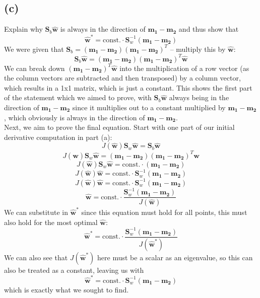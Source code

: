 \documentclass{article}
\begin{document}
{\subsection*{(c)}
Explain why \(\mathbf{S}_b \hat{\mathbf{w}}\) is always in the direction of \(\mathbf{m_1} - \mathbf{m_2}\) and thus show that 
\[
  \hat{\mathbf{w}}^* = \text{const.} \cdot \mathbf{S}_w^{-1} (\mathbf{m_1} - \mathbf{m_2})
\]
We were given that \(\mathbf{S}_b = (\mathbf{m_1} - \mathbf{m_2}) (\mathbf{m_1} - \mathbf{m_2})^T\) -- multiply this by \(\hat{\mathbf{w}}\):
\[
  \mathbf{S}_b \hat{\mathbf{w}} = (\mathbf{m_1} - \mathbf{m_2}) (\mathbf{m_1} - \mathbf{m_2})^T \hat{\mathbf{w}}
\]
We can break down \((\mathbf{m_1} - \mathbf{m_2})^T \hat{\mathbf{w}}\) into the multiplication of a row vector (as the column vectors are subtracted and then transposed) by a column vector, which results in a 1x1 matrix, which is just a constant. This shows the first part of the statement which we aimed to prove, with \(\mathbf{S}_b \hat{\mathbf{w}}\) always being in the direction of \(\mathbf{m_1} - \mathbf{m_2}\) since it multiplies out to a constant multiplied by \(\mathbf{m_1} - \mathbf{m_2}\), which obviously is always in the direction of \(\mathbf{m_1} - \mathbf{m_2}\). \\ 
Next, we aim to prove the final equation. Start with one part of our initial derivative computation in part (a):
\[
  J(\hat{\mathbf{w}}) \mathbf{S}_w \hat{\mathbf{w}} = \mathbf{S}_b \hat{\mathbf{w}}
\]
\[
  J(\hat{\mathbf{w}}) \mathbf{S}_w \hat{\mathbf{w}} = (\mathbf{m_1} - \mathbf{m_2}) (\mathbf{m_1} - \mathbf{m_2})^T \hat{\mathbf{w}}
\]
\[
  J(\hat{\mathbf{w}}) \mathbf{S}_w \hat{\mathbf{w}} = \text{const.} \cdot (\mathbf{m_1} - \mathbf{m_2}) 
\]
\[
  J(\hat{\mathbf{w}}) \hat{\mathbf{w}} = \text{const.} \cdot \mathbf{S}_w^{-1} (\mathbf{m_1} - \mathbf{m_2}) 
\]
\[
  J(\hat{\mathbf{w}}) \hat{\mathbf{w}} = \text{const.} \cdot \mathbf{S}_w^{-1} (\mathbf{m_1} - \mathbf{m_2}) 
\]
\[
  \hat{\mathbf{w}} = \text{const.} \cdot \frac{\mathbf{S}_w^{-1} (\mathbf{m_1} - \mathbf{m_2}) }{J(\hat{\mathbf{w}})}
\]
We can substitute in \(\hat{\mathbf{w}}^*\) since this equation must hold for all points, this must also hold for the most optimal \(\hat{\mathbf{w}}\):
\[
  \hat{\mathbf{w}}^* = \text{const.} \cdot \frac{\mathbf{S}_w^{-1} (\mathbf{m_1} - \mathbf{m_2}) }{J(\hat{\mathbf{w}}^*)}
\]
We can also see that \(J(\hat{\mathbf{w}}^*)\) here must be a scalar as an eigenvalue, so this can also be treated as a constant, leaving us with 
\[
  \hat{\mathbf{w}}^* = \text{const.} \cdot \mathbf{S}_w^{-1} (\mathbf{m_1} - \mathbf{m_2})
\]
which is exactly what we sought to find.

}
\end{document}
